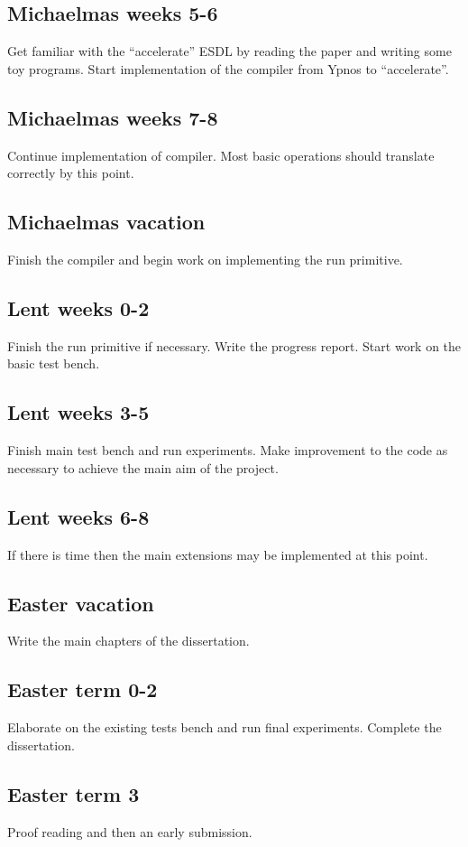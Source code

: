\subsection*{Michaelmas weeks 5-6} Get familiar with the ``accelerate'' ESDL by 
reading the paper and writing some toy programs. Start implementation of the 
compiler from Ypnos to ``accelerate''.

\subsection*{Michaelmas weeks 7-8} Continue implementation of compiler. Most 
basic operations should translate correctly by this point.

\subsection*{Michaelmas vacation} Finish the compiler and begin work on 
implementing the run primitive.

\subsection*{Lent weeks 0-2} Finish the run primitive if necessary. Write the 
progress report. Start work on the basic test bench.

\subsection*{Lent weeks 3-5} Finish main test bench and run experiments. Make 
improvement to the code as necessary to achieve the main aim of the project. 

\subsection*{Lent weeks 6-8} If there is time then the main extensions may be 
implemented at this point.

\subsection*{Easter vacation} Write the main chapters of the dissertation.

\subsection*{Easter term 0-2} Elaborate on the existing tests bench and run 
final experiments. Complete the dissertation.

\subsection*{Easter term 3} Proof reading and then an early submission.  


 

